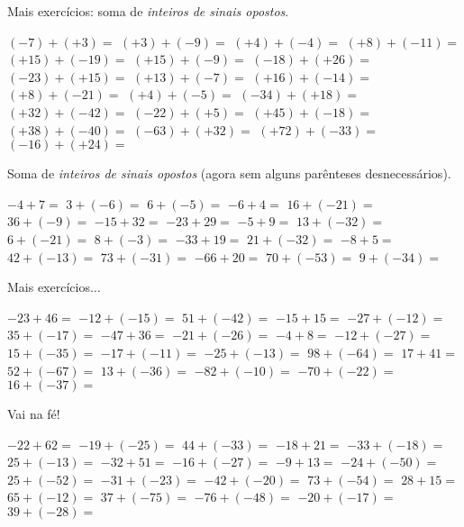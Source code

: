 \begin{questions}
\begin{choices}
\end{choices}


	\question Mais exercícios: soma de \textit{inteiros de sinais opostos}.

\begin{choices}
	
	\choice $(-7)+(+3)=$
	\choice $(+3)+(-9)=$
	\choice $(+4)+(-4)=$
	\choice $(+8)+(-11)=$
	\choice $(+15)+(-19)=$
	\choice $(+15)+(-9)=$
	\choice $(-18)+(+26)=$
	\choice $(-23)+(+15)=$
	\choice $(+13)+(-7)=$
	\choice $(+16)+(-14)=$
	\choice $(+8)+(-21)=$
	\choice $(+4)+(-5)=$
	\choice $(-34)+(+18)=$
	\choice $(+32)+(-42)=$
	\choice $(-22)+(+5)=$
	\choice $(+45)+(-18)=$
	\choice $(+38)+(-40)=$
	\choice $(-63)+(+32)=$
	\choice $(+72)+(-33)=$
	\choice $(-16)+(+24)=$
	
\end{choices}

	\newpage
	\question Soma de \textit{inteiros de sinais opostos} (agora sem alguns parênteses desnecessários).

\begin{choices}
	
	\choice $-4 + 7=$
	\choice $3 + (-6)=$
	\choice $6 + (-5)=$
	\choice $-6 + 4=$
	\choice $16 + (-21)=$
	\choice $36 + (-9)=$
	\choice $-15 + 32=$
	\choice $-23 + 29=$
	\choice $-5 + 9=$
	\choice $13 + (-32)=$
	\choice $6 + (-21)=$
	\choice $8 + (-3)=$
	\choice $-33 + 19=$
	\choice $21 + (-32)=$
	\choice $-8 + 5=$
	\choice $42 + (-13)=$
	\choice $73 + (-31)=$
	\choice $-66 + 20=$
	\choice $70 + (-53)=$
	\choice $9 + (-34)=$
	

\end{choices}

	\question Mais exercícios$\ldots$

\begin{choices}
	
	\choice $-23 + 46=$
	\choice $-12 + (-15)=$
	\choice $51 + (-42)=$
	\choice $-15 + 15=$
	\choice $-27 + (-12)=$
	\choice $35 + (-17)=$
	\choice $-47 + 36=$
	\choice $-21 +(-26)=$
	\choice $-4 + 8=$
	\choice $-12 + (-27)=$
	\choice $15 + (-35)=$
	\choice $-17 + (-11)=$
	\choice $-25 + (-13)=$
	\choice $98 + (-64)=$
	\choice $17 + 41=$
	\choice $52 + (-67)=$
	\choice $13 + (-36)=$
	\choice $-82 + (-10)=$
	\choice $-70 + (-22)=$
	\choice $16 + (-37)=$
	
\end{choices}

	\question Vai na fé!

\begin{choices}
	
	\choice $-22 + 62=$
	\choice $-19 + (-25)=$
	\choice $44 + (-33)=$
	\choice $-18 + 21=$
	\choice $-33 + (-18)=$
	\choice $25 + (-13)=$
	\choice $-32 + 51=$
	\choice $-16 + (-27)=$
	\choice $-9 + 13=$
	\choice $-24 + (-50)=$
	\choice $25 + (-52)=$
	\choice $-31 + (-23)=$
	\choice $-42 + (-20)=$
	\choice $73 + (-54)=$
	\choice $28 + 15=$
	\choice $65 + (-12)=$
	\choice $37 + (-75)=$
	\choice $-76 +(-48)=$
	\choice $-20 + (-17)=$
	\choice $39 + (-28)=$

	
\end{choices}


\end{questions}